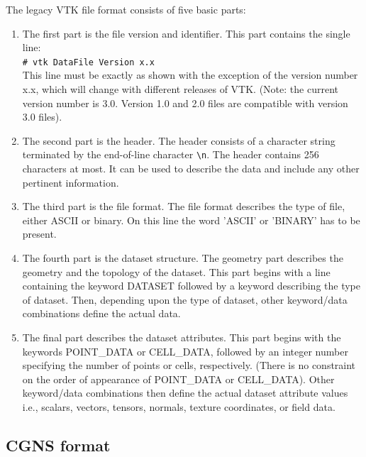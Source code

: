 The legacy VTK file format consists of five basic parts:

\begin{enumerate}
\setlength{\itemsep}{1pt}
\setlength{\parskip}{0pt}
\setlength{\parsep}{0pt}
\item The first part is the file version and identifier. This part contains the
single line:\\ \verb+# vtk DataFile Version x.x+\\ This line must be exactly as
shown with the exception of the version number x.x, which will change with
different releases of VTK. (Note: the current version number is 3.0. Version
1.0 and 2.0 files are compatible with version 3.0 files).
\item The second part is the header. The header consists of a character string
terminated by the end-of-line character \verb+\n+. The header contains 256
characters at most. It can be used to describe the data and include any other
pertinent information.
\item The third part is the file format. The file format describes the type of
file, either ASCII or binary.  On this line the word 'ASCII' or 'BINARY' has to
be present.
\item The fourth part is the dataset structure. The geometry part describes the
geometry and the topology of the dataset. This part begins with a line
containing the keyword DATASET followed by a keyword describing the type of
dataset.  Then, depending upon the type of dataset, other keyword/data
combinations define the actual data.
\item The final part describes the dataset attributes. This part begins with
the keywords POINT\_DATA or CELL\_DATA, followed by an integer number
specifying the number of points or cells, respectively. (There is no constraint
on the order of appearance of POINT\_DATA or CELL\_DATA). Other keyword/data
combinations then define the actual dataset attribute values i.e., scalars,
vectors, tensors, normals, texture coordinates, or field data.
\end{enumerate}

\subsection{CGNS format}

